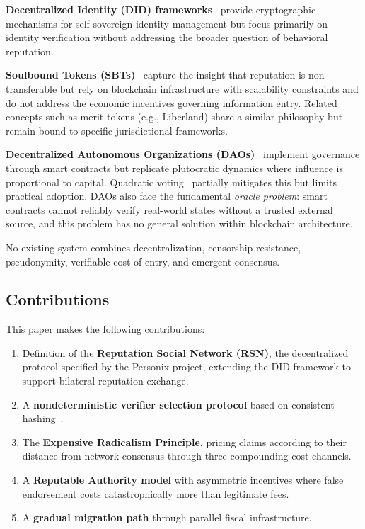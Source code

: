 \documentclass[11pt,a4paper,twocolumn]{article}
\begin{document}
\textbf{Decentralized Identity (DID) frameworks}~\cite{did2022} provide cryptographic mechanisms for self-sovereign identity management but focus primarily on identity verification without addressing the broader question of behavioral reputation.

\textbf{Soulbound Tokens (SBTs)}~\cite{weyl2022} capture the insight that reputation is non-transferable but rely on blockchain infrastructure with scalability constraints and do not address the economic incentives governing information entry. Related concepts such as merit tokens (e.g., Liberland) share a similar philosophy but remain bound to specific jurisdictional frameworks.

\textbf{Decentralized Autonomous Organizations (DAOs)}~\cite{buterin2014} implement governance through smart contracts but replicate plutocratic dynamics where influence is proportional to capital. Quadratic voting~\cite{buterin2019} partially mitigates this but limits practical adoption. DAOs also face the fundamental \emph{oracle problem}: smart contracts cannot reliably verify real-world states without a trusted external source, and this problem has no general solution within blockchain architecture.

No existing system combines decentralization, censorship resistance, pseudonymity, verifiable cost of entry, and emergent consensus.

\subsection{Contributions}

This paper makes the following contributions:
\begin{enumerate}[nosep]
\item Definition of the \textbf{Reputation Social Network (RSN)}, the decentralized protocol specified by the Personix project, extending the DID framework to support bilateral reputation exchange.
\item A \textbf{nondeterministic verifier selection protocol} based on consistent hashing~\cite{karger1997}.
\item The \textbf{Expensive Radicalism Principle}, pricing claims according to their distance from network consensus through three compounding cost channels.
\item A \textbf{Reputable Authority model} with asymmetric incentives where false endorsement costs catastrophically more than legitimate fees.
\item A \textbf{gradual migration path} through parallel fiscal infrastructure.
\end{enumerate}
\end{document}
